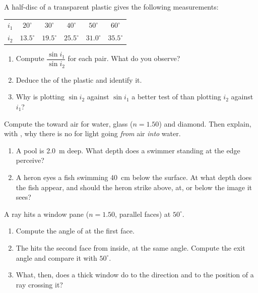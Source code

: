 \begin{exercise}[$\star\star$]\label{exo:g10:refraction:6}
A half-disc of a transparent plastic gives the following measurements:
\begin{center}
\begin{tabular}{lccccc}
$i_1$ & $20^\circ$ & $30^\circ$ & $40^\circ$ & $50^\circ$ & $60^\circ$ \\
$i_2$ & $13.5^\circ$ & $19.5^\circ$ & $25.5^\circ$ & $31.0^\circ$
      & $35.5^\circ$ \\
\end{tabular}
\end{center}
\begin{enumerate}
  \item Compute $\dfrac{\sin i_1}{\sin i_2}$ for each pair. What do you
        observe?
  \item Deduce the  of the plastic and identify it.
  \item Why is plotting $\sin i_2$ against $\sin i_1$ a better test of
         than plotting $i_2$ against $i_1$?
\end{enumerate}
\end{exercise}

\begin{exercise}[$\star\star$]\label{exo:g10:refraction:7}
Compute the  toward air for water, glass ($n = 1.50$) and
diamond. Then explain, with , why there is no 
for light going \emph{from} air \emph{into} water.
\end{exercise}

\begin{exercise}[$\star\star$]\label{exo:g10:refraction:8}
\begin{enumerate}
  \item A pool is \qty{2.0}{m} deep. What depth does a swimmer standing
        at the edge perceive?
  \item A heron eyes a fish swimming \qty{40}{cm} below the surface. At
        what depth does the fish appear, and should the heron strike
        above, at, or below the image it sees?
\end{enumerate}
\end{exercise}

\begin{exercise}[$\star\star$]\label{exo:g10:refraction:9}
A ray hits a window pane ($n = 1.50$, parallel faces) at $50^\circ$.
\begin{enumerate}
  \item Compute the angle of  at the first face.
  \item The  hits the second face from inside, at the same
        angle. Compute the exit angle and compare it with $50^\circ$.
  \item What, then, does a thick window do to the direction and to the
        position of a ray crossing it?
\end{enumerate}
\end{exercise}

